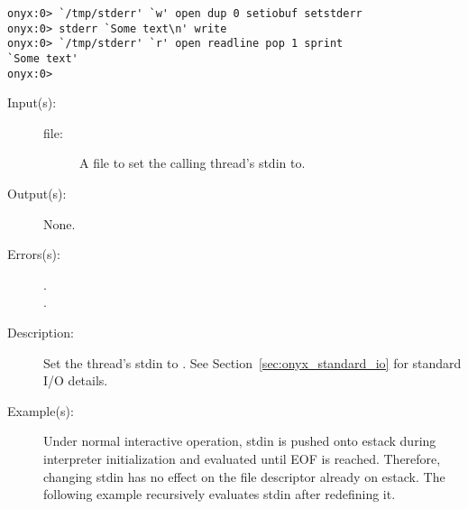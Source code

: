 \begin{description}
\begin{description}
\begin{verbatim}
onyx:0> `/tmp/stderr' `w' open dup 0 setiobuf setstderr
onyx:0> stderr `Some text\n' write
onyx:0> `/tmp/stderr' `r' open readline pop 1 sprint
`Some text'
onyx:0>
		\end{verbatim}
	\end{description}
\label{systemdict:setstdin}
\item[{\onyxop{file}{setstdin}{--}}: ]
	\begin{description}\item[]
	\item[Input(s): ]
		\begin{description}\item[]
		\item[file: ]
			A file to set the calling thread's stdin to.
		\end{description}
	\item[Output(s): ] None.
	\item[Errors(s): ]
		\begin{description}\item[]
		\item[.]
		\item[.]
		\end{description}
	\item[Description: ]
		Set the thread's stdin to .  See
		Section~\ref{sec:onyx_standard_io} for standard I/O details.
	\item[Example(s): ]
		Under normal interactive operation, stdin is pushed onto estack
		during interpreter initialization and evaluated until EOF is
		reached.  Therefore, changing stdin has no effect on the file
		descriptor already on estack.  The following example recursively
		evaluates stdin after redefining it.
\begin{verbatim}


\end{verbatim}
\end{description}
\end{description}
